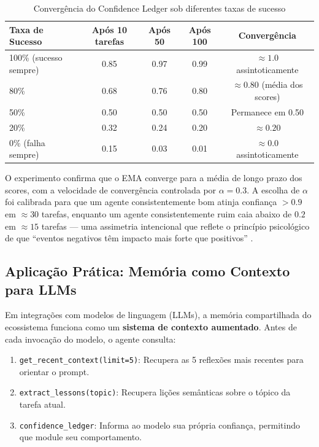 \begin{table}[htbp]
\centering
\caption{Convergência do Confidence Ledger sob diferentes taxas de sucesso}
\label{tab:confidence-convergence}
\begin{tabular}{@{}p{3cm}cccc@{}}
\toprule
\textbf{Taxa de Sucesso} & \textbf{Após 10 tarefas} & \textbf{Após 50} & \textbf{Após 100} & \textbf{Convergência} \\
\midrule
100\% (sucesso sempre) & 0.85 & 0.97 & 0.99 & $\approx 1.0$ assintoticamente \\
80\% & 0.68 & 0.76 & 0.80 & $\approx 0.80$ (média dos scores) \\
50\% & 0.50 & 0.50 & 0.50 & Permanece em 0.50 \\
20\% & 0.32 & 0.24 & 0.20 & $\approx 0.20$ \\
0\% (falha sempre) & 0.15 & 0.03 & 0.01 & $\approx 0.0$ assintoticamente \\
\bottomrule
\end{tabular}
\end{table}

O experimento confirma que o EMA converge para a média de longo prazo dos scores, com a velocidade de convergência controlada por $\alpha = 0.3$. A escolha de $\alpha$ foi calibrada para que um agente consistentemente bom atinja confiança $> 0.9$ em $\approx 30$ tarefas, enquanto um agente consistentemente ruim caia abaixo de $0.2$ em $\approx 15$ tarefas — uma assimetria intencional que reflete o princípio psicológico de que ``eventos negativos têm impacto mais forte que positivos'' \cite{Baumeister2001_BadStronger}.

\subsection{Aplicação Prática: Memória como Contexto para LLMs}

Em integrações com modelos de linguagem (LLMs), a memória compartilhada do ecossistema funciona como um \textbf{sistema de contexto aumentado}. Antes de cada invocação do modelo, o agente consulta:

\begin{enumerate}
    \item \texttt{get\_recent\_context(limit=5)}: Recupera as 5 reflexões mais recentes para orientar o prompt.
    \item \texttt{extract\_lessons(topic)}: Recupera lições semânticas sobre o tópico da tarefa atual.
    \item \texttt{confidence\_ledger}: Informa ao modelo sua própria confiança, permitindo que module seu comportamento.
\end{enumerate}

